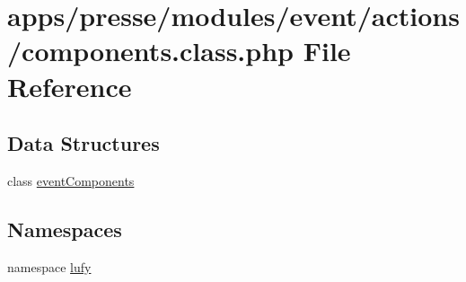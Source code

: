 \hypertarget{presse_2modules_2event_2actions_2components_8class_8php}{\section{apps/presse/modules/event/actions/components.class.\-php File Reference}
\label{presse_2modules_2event_2actions_2components_8class_8php}
}
\subsection*{Data Structures}
\begin{DoxyCompactItemize}
\item 
class \hyperlink{classevent_components}{event\-Components}
\end{DoxyCompactItemize}
\subsection*{Namespaces}
\begin{DoxyCompactItemize}
\item 
namespace \hyperlink{namespacelufy}{lufy}
\end{DoxyCompactItemize}
